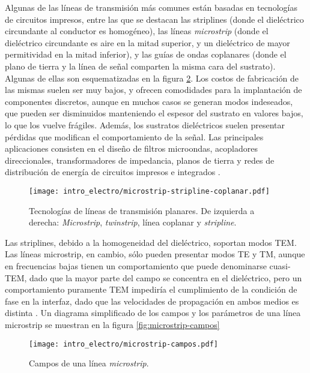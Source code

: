 Algunas de las líneas de transmisión más comunes están basadas en tecnologías de circuitos impresos, entre las que se destacan las striplines (donde el dieléctrico circundante al conductor es homogéneo), las líneas \textit{microstrip} (donde el dieléctrico circundante es aire en la mitad superior, y un dieléctrico de mayor permitividad en la mitad inferior), y las guías de ondas coplanares (donde el plano de tierra y la línea de señal comparten la misma cara del sustrato). Algunas de ellas son esquematizadas en la figura \ref{fig:strip-line-technology}. Los costos de fabricación de las mismas suelen ser muy bajos, y ofrecen comodidades para la implantación de componentes discretos, aunque en muchos casos se generan modos indeseados, que pueden ser disminuidos manteniendo el espesor del sustrato en valores bajos, lo que los vuelve frágiles. Además, los sustratos dieléctricos suelen presentar pérdidas que modifican el comportamiento de la señal. Las principales aplicaciones consisten en el diseño de filtros microondas, acopladores direccionales, transformadores de impedancia, planos de tierra y redes de distribución de energía de circuitos impresos e integrados \cite{Venkateswaran}.


\begin{figure}[htp]
	\centering
	\texttt{[image: intro\_electro/microstrip-stripline-coplanar.pdf]}
	\caption{Tecnologías de líneas de transmisión planares. De izquierda a derecha: \textit{Microstrip}, \textit{twinstrip}, línea coplanar y \textit{stripline}.}
	\label{fig:strip-line-technology}
\end{figure}

Las striplines, debido a la homogeneidad del dieléctrico, soportan modos TEM. Las líneas microstrip, en cambio, sólo pueden presentar modos TE y TM, aunque en frecuencias bajas tienen un comportamiento que puede denominarse cuasi-TEM, dado que la mayor parte del campo se concentra en el dieléctrico, pero un comportamiento puramente TEM impediría el cumplimiento de la condición de fase en la interfaz, dado que las velocidades de propagación en ambos medios es distinta \cite{Pozar:MwEngineering}. Un diagrama simplificado de los campos y los parámetros de una línea microstrip se muestran en la figura \ref{fig:microstrip-campos}


\begin{figure}[htp]
	\centering
	\texttt{[image: intro\_electro/microstrip-campos.pdf]}
	\caption{Campos de una línea \textit{microstrip}.}
	\label{fig:strip-line-technology}
\end{figure}

